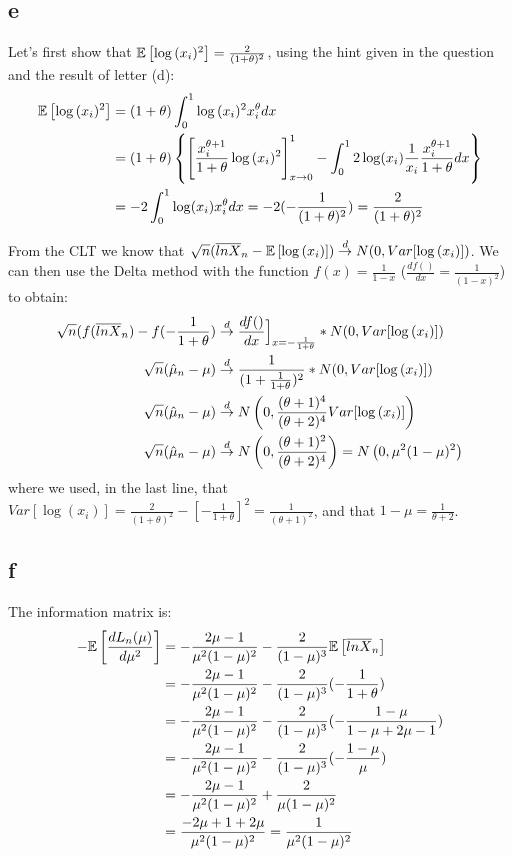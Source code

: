 \documentclass[12pt]{paper}
\begin{document}
\subsection*{e}

Let's first show that $\mathbb{E} \left [ \log{(x_i)^2} \right ]=\frac{2}{(1+\theta)^2}$, using the hint given in the question and the result of letter (d):
\begin{align*}
\mathbb{E} \left [ \log{(x_i)^2} \right ]&=(1+\theta)\int^1_0{\log{(x_i)^2}x_i^{\theta}dx}\\
&=(1+\theta)\left\{ \left[\frac{x_i^{\theta+1}}{1+\theta}\log{(x_i)^2}\right]^{1}_{x\to0} -\int^1_0{2\log(x_i)\frac{1}{x_i}\frac{x_i^{\theta+1}}{1+\theta}dx}\right\}\\
&=-2\int^1_0{\log(x_i)x_i^{\theta}dx}=-2(-\frac{1}{(1+\theta)^2})=\frac{2}{(1+\theta)^2}
\end{align*}

From the CLT we know that $\sqrt{n}(\overline{lnX}_n-\mathbb{E} \left [ \log{(x_i)} \right ])\overset{d}{\to} N(0,Var[\log{(x_i)}])$. We can then use the Delta method with the function $f(x)=\frac{1}{1-x}$ ($\frac{df()}{dx}=\frac{1}{(1-x)^2}$) to obtain:
\begin{align*}
\sqrt{n}(f(\overline{lnX}_n)-f(-\frac{1}{1+\theta})&\overset{d}{\to} \frac{df()}{dx}\Big]_{x=-\frac{1}{1+\theta}}*N(0,Var[\log{(x_i)}])\\
\sqrt{n}(\hat{\mu}_n-\mu)&\overset{d}{\to} \frac{1}{(1+\frac{1}{1+\theta})^2}* N(0,Var[\log{(x_i)}])\\
\sqrt{n}(\hat{\mu}_n-\mu)&\overset{d}{\to} N\left(0,\frac{(\theta+1)^4}{(\theta+2)^4}Var[\log{(x_i)}]\right)\\
\sqrt{n}(\hat{\mu}_n-\mu)&\overset{d}{\to} N\left(0,\frac{(\theta+1)^2}{(\theta+2)^4}\right)=N\left(0,\mu^2(1-\mu)^2\right)\\
\end{align*}
\noindent where we used, in the last line, that $Var[\log{(x_i)}]=\frac{2}{(1+\theta)^2}-[-\frac{1}{1+\theta}]^2=\frac{1}{(\theta+1)^2}$, and that $1-\mu=\frac{1}{\theta+2}$.


\subsection*{f}

The information matrix is:
\begin{align*}
-\mathbb{E} \left [ \frac{dL_n(\mu)}{d\mu^2} \right ]&=-\frac{2\mu-1}{\mu^2(1-\mu)^2}-\frac{2}{(1-\mu)^3}\mathbb{E} \left [ \overline{lnX}_n \right ]\\
&=-\frac{2\mu-1}{\mu^2(1-\mu)^2}-\frac{2}{(1-\mu)^3}(-\frac{1}{1+\theta})\\
&=-\frac{2\mu-1}{\mu^2(1-\mu)^2}-\frac{2}{(1-\mu)^3}(-\frac{1-\mu}{1-\mu+2\mu-1})\\
&=-\frac{2\mu-1}{\mu^2(1-\mu)^2}-\frac{2}{(1-\mu)^3}(-\frac{1-\mu}{\mu})\\
&=-\frac{2\mu-1}{\mu^2(1-\mu)^2}+\frac{2}{\mu(1-\mu)^2}\\
&=\frac{-2\mu+1+2\mu}{\mu^2(1-\mu)^2}=\frac{1}{\mu^2(1-\mu)^2}
\end{align*}
\end{document}
